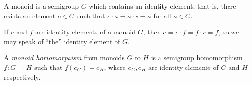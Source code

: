 \documentclass{article}
\begin{document}
A monoid is a semigroup $G$ which contains an identity element; that is, there exists an element $e \in G$ such that $e \cdot a = a \cdot e = a$ for all $a \in G$.

If $e$ and $f$ are identity elements of a monoid $G$, then $e=e\cdot f=f\cdot e=f$, so we may speak of ``the'' identity element of $G$.

A \emph{monoid homomorphism} from monoids $G$ to $H$ is a semigroup homomorphism $f:G\to H$ such that $f(e_G)=e_H$, where $e_G,e_H$ are identity elements of $G$ and $H$ respectively.
\end{document}
